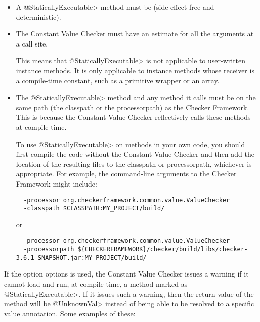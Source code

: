 \begin{itemize}
\item
  A \<@StaticallyExecutable> method must be
   (side-effect-free and deterministic).

\item
  The Constant Value Checker must have an estimate for all the arguments at
  a call site.

  This means that \<@StaticallyExecutable> is not applicable
  to user-written instance methods.  It is only applicable to instance
  methods whose receiver is a compile-time constant, such as a primitive
  wrapper or an array.

\item
  The \<@StaticallyExecutable> method and any method it calls must be on
  the same path (the classpath or the processorpath) as the Checker
  Framework.  This is because the Constant Value Checker reflectively calls
  these methods at compile time.

To use \<@StaticallyExecutable> on methods in your own code, you should
first compile the code without the Constant Value Checker and then add
the location of the resulting  files to the
classpath or processorpath, whichever is appropriate. For example, the
command-line arguments to the Checker Framework
might include:
\begin{Verbatim}
  -processor org.checkerframework.common.value.ValueChecker
  -classpath $CLASSPATH:MY_PROJECT/build/
\end{Verbatim}
or
\begin{Verbatim}
  -processor org.checkerframework.common.value.ValueChecker
  -processorpath ${CHECKERFRAMEWORK}/checker/build/libs/checker-3.6.1-SNAPSHOT.jar:MY_PROJECT/build/
\end{Verbatim}

\end{itemize}



If the option  options is used, the Constant Value Checker issues a warning if it cannot load and run, at
compile time, a method marked as \<@StaticallyExecutable>.  If it issues
such a warning, then the return value of the method will be \<@UnknownVal>
instead of being able to be resolved to a specific value annotation.
Some examples of these:


